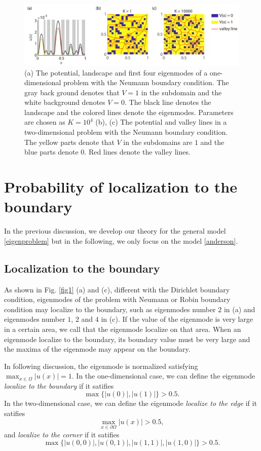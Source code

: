 \documentclass[a4paper,11pt]{article}
\begin{document}
\begin{figure}
\centering
\includegraphics[width=\linewidth]{Fig2}
\caption{(a) The potential, landscape and first four eigenmodes of a one-dimensional problem with the Neumann boundary condition. The gray back ground denotes that $V = 1$ in the subdomain and the white background denotes $V = 0$. The black line denotes the landscape and the colored lines denote the eigenmodes. Parameters are chosen as $K = 10^4$ (b), (c) The potential and valley lines in a two-dimensional problem with the Neumann boundary condition. The yellow parts denote that $V$ in the subdomains are $1$ and the blue parts denote $0$. Red lines denote the valley lines.}
\label{fig2}
\end{figure}

\section{Probability of localization to the boundary}

In the previous discussion, we develop our theory for the general model \eqref{eigenproblem} but in the following, we only focus on the model \eqref{anderson}.

\subsection{Localization to the boundary}

As shown in Fig. \ref{fig1} (a) and (c), different with the Dirichlet boundary condition, eigenmodes of the problem with Neumann or Robin boundary condition may localize to the boundary, such as eigenmodes number $2$ in (a) and eigenmodes number $1$, $2$ and $4$ in (c). If the value of the eigenmode is very large in a certain area, we call that the eigenmode localize on that area. When an eigenmode localize to the boundary, its boundary value must be very large and the maxima of the eigenmode may appear on the boundary.

In following discussion, the eigenmode is normalized satisfying $\max_{x \in \Omega} |u(x)| = 1$. In the one-dimensional case, we can define the eigenmode \emph{localize to the boundary} if it satifies
\begin{equation}\label{probbound}
\max\{|u(0)|, |u(1)|\} > 0.5.
\end{equation}
In the two-dimensional case, we can define the eigenmode \emph{localize to the edge} if it satifies
\begin{equation}\label{probedge}
\max_{x \in \partial \Omega} |u(x)| > 0.5,
\end{equation}
and \emph{localize to the corner} if it satifies
\begin{equation}\label{probcorner}
\max\{|u(0,0)|, |u(0,1)|, |u(1,1)|, |u(1,0)|\} > 0.5.
\end{equation}
\end{document}
